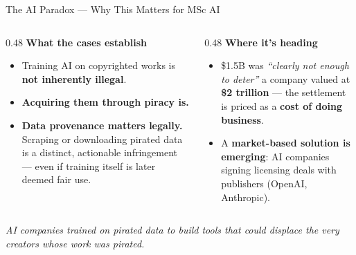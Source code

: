 \documentclass[aspectratio=169,11pt]{beamer}
\begin{document}
	\begin{frame}{The AI Paradox --- Why This Matters for MSc AI}
		\vspace{0.2cm}
		\begin{columns}[T,onlytextwidth]
			\begin{column}{0.48\textwidth}
				\textbf{\color{ctpMauve}What the cases establish}\\[0.25cm]
				\begin{itemize}\itemsep0.5em
					\item Training AI on copyrighted works is \textbf{not inherently illegal}.
					\item \textbf{Acquiring them through piracy is.}
					\item \textbf{Data provenance matters legally.} Scraping or downloading pirated data is a distinct, actionable infringement --- even if training itself is later deemed fair use.
				\end{itemize}
			\end{column}
			\begin{column}{0.48\textwidth}
				\textbf{\color{ctpMauve}Where it's heading}\\[0.25cm]
				\begin{itemize}\itemsep0.5em
					\item \$1.5B was \emph{``clearly not enough to deter''} a company valued at \textbf{\$2 trillion} --- the settlement is priced as a \textbf{cost of doing business}.
					\item A \textbf{market-based solution is emerging}: AI companies signing licensing deals with publishers (OpenAI, Anthropic).
				\end{itemize}
			\end{column}
		\end{columns}
		\vspace{0.4cm}
		\begin{quotebox}
			\centering\small\itshape\color{ctpPink}
			AI companies trained on pirated data to build tools that could displace the very creators whose work was pirated.
		\end{quotebox}
	\end{frame}
	
\end{document}
